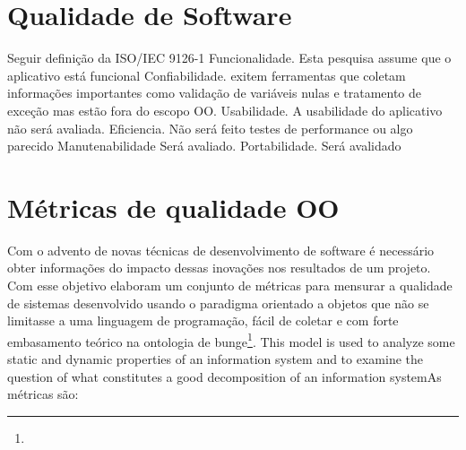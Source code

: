 

\section{Qualidade de Software}

Seguir definição da ISO/IEC 9126-1
Funcionalidade. Esta pesquisa assume que o aplicativo está funcional
Confiabilidade. exitem ferramentas que coletam informações importantes como
validação de variáveis nulas e tratamento de exceção mas estão fora do escopo
OO.
Usabilidade. A usabilidade do aplicativo não será
avaliada.
Eficiencia. Não será feito testes de performance ou algo parecido
Manutenabilidade Será avaliado.
Portabilidade. Será avalidado
\section{Métricas de qualidade OO}
\label{sec:metrics}

Com o advento de novas técnicas de desenvolvimento de software é necessário
obter informações do impacto dessas inovações nos resultados de um projeto. Com
esse objetivo  elaboram um conjunto de métricas para
mensurar a qualidade de sistemas desenvolvido usando o paradigma orientado a objetos que
não se limitasse a uma linguagem de programação, fácil de coletar e com forte
embasamento teórico na ontologia de bunge\footnote{}. This model is used to analyze
some static and dynamic properties of an information system and to examine the
question of what constitutes a good decomposition of an information
system\cite{WandWeber}As métricas são:




